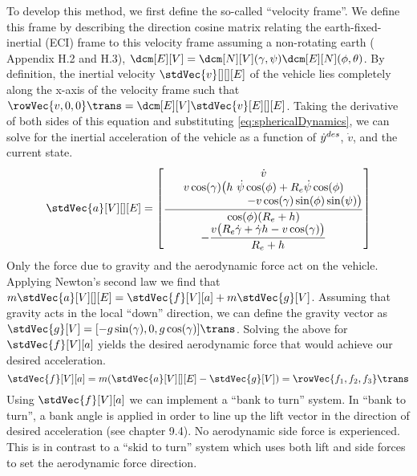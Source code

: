 \documentclass{UnderReview}
\begin{document}
To develop this method, we first define the so-called ``velocity frame''. 
We define this frame by describing the direction cosine matrix relating the earth-fixed-inertial (ECI) frame to this velocity frame assuming a non-rotating earth (\cite{reganBook1993} Appendix H.2 and H.3), $\Cev=\dcm[N][V](\vpa,\hpa)\dcm[E][N](\lat,\lng)$.
%
\def \vE {\stdVec{v}[E][][E]}
%
By definition, the inertial velocity $ \stdVec{v}[][][E] $ of the vehicle lies completely along the x-axis of the velocity frame such that $\rowVec{v,0,0}\trans = \Cev \vE$.
%
Taking the derivative of both sides of this equation and substituting \eqref{eq:sphericalDynamics}, we can solve for the inertial acceleration of the vehicle as a function of $ \dot y^{des} $, $ \dot{v} $, and the current state.
%
\def \accelV {\stdVec{a}[V][][E]}
\def \Re {R_e}
%
\begin{align*}\label{key}
	\accelV = \begin{bmatrix}	
		\dot{v} \\
		\dfrac{\begin{matrix} v\cos(\gamma)\big(h~\dot{\psi}\cos(\phi) + \Re\dot{\psi}\cos(\phi) \\ ~~~~~~~~~~~~~~~~~~~~~~-v\cos(\gamma)\sin(\phi)\sin(\psi)\big)\end{matrix}}{\cos(\phi)(\Re + h)}\\
		- \dfrac{v\big(\Re\dot{\gamma} + \dot{\gamma}h - v\cos(\gamma)\big)}{\Re + h}	
\end{bmatrix}
\end{align*}
%
Only the force due to gravity and the aerodynamic force act on the vehicle. 
Applying Newton's second law we find that
%
\def \FaeroV {\stdVec{f}[V][a]}
\def \gravV {\stdVec{g}[V]}
%
%
$m \accelV	= \FaeroV + m \gravV$.
Assuming that gravity acts in the local ``down'' direction, we can define the gravity vector as $\gravV = [{-g \sin(\gamma), 0, g \cos(\gamma)}]\trans$.
%
Solving the above for $ \FaeroV $ yields the desired aerodynamic force that would achieve our desired acceleration.
\begin{equation}\label{key}
	\FaeroV = m(\accelV-\gravV) = \rowVec{f_1, f_2, f_3}\trans
\end{equation}
%
Using $ \FaeroV $ we can implement a ``bank to turn'' system. 
In ``bank to turn'', a bank angle is applied in order to line up the lift vector in the direction of desired acceleration (see \cite{reganBook1993} chapter 9.4). 
No aerodynamic side force is experienced. 
This is in contrast to a ``skid to turn'' system which uses both lift and side forces to set the aerodynamic force direction. 
\end{document}
